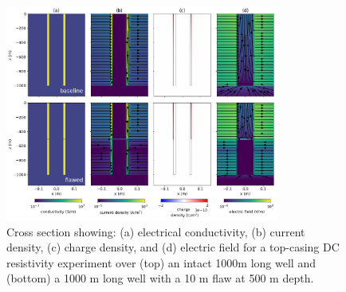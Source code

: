 \begin{figure}
    \begin{center}
    \includegraphics[width=0.8\textwidth]{figures/casing_integrity_basics.png}
    \end{center}
\caption{
    Cross section showing: (a) electrical conductivity, (b) current density, (c) charge density, and (d) electric field
    for a top-casing DC resistivity experiment over (top) an intact 1000m long well and (bottom) a 1000 m long well
    with a 10 m flaw at 500 m depth.
}
\label{fig:casing_integrity_basics}
\end{figure}
